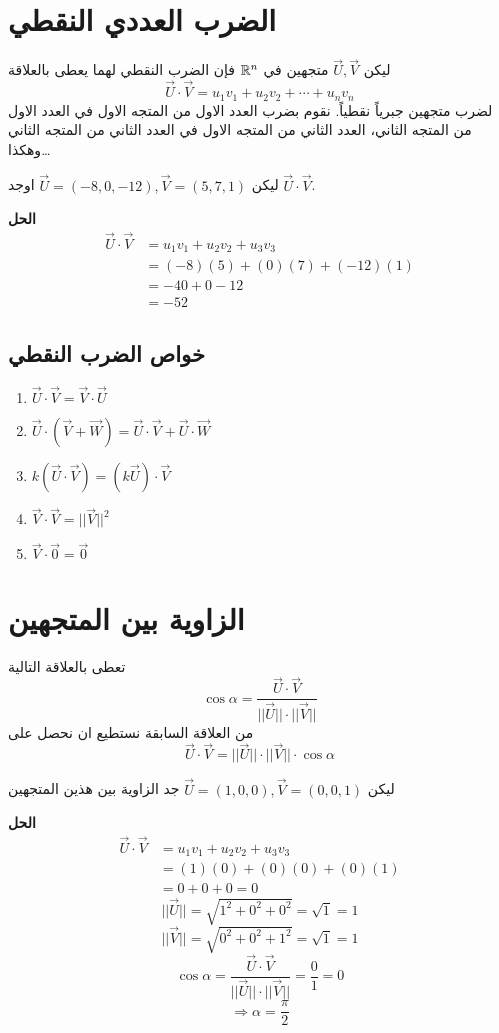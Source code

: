 \section{الضرب العددي النقطي}
ليكن $\vec{U}, \vec{V}$ متجهين في $\mathbb{R}^n$ فإن الضرب النقطي لهما يعطى بالعلاقة 
\[
\vec{U} \cdot \vec{V} = u_1v_1 + u_2v_2 + \cdots + u_nv_n
\]
\noindent
لضرب متجهين جبرياً نقطياً. نقوم بضرب العدد الاول من المتجه الاول في العدد الاول من المتجه الثاني، العدد الثاني من المتجه الاول في العدد الثاني من المتجه الثاني وهكذا\dots
\begin{example}
	ليكن 
	$\vec{U} = (-8, 0, -12), \vec{V}=(5,7,1)$
	اوجد $\vec{U}\cdot\vec{V}$.
\end{example}
\noindent
\textbf{الحل}
\begin{align*}
	\vec{U}\cdot\vec{V} &= u_1v_1 + u_2v_2 + u_3v_3\\
	&= (-8)(5) + (0)(7) + (-12)(1)\\
	&= -40 + 0 -12\\
	&= -52
\end{align*}

\subsection*{خواص الضرب النقطي}

\begin{english}
	\begin{enumerate}
		\item $\vec{U}\cdot\vec{V}=\vec{V}\cdot\vec{U}$
		\item $\vec{U}\cdot(\vec{V}+\vec{W}) = \vec{U}\cdot\vec{V} + \vec{U}\cdot\vec{W}$
		\item $k(\vec{U}\cdot\vec{V}) = (k\vec{U})\cdot\vec{V}$
		\item $\vec{V}\cdot\vec{V} = ||\vec{V}||^2$
		\item $\vec{V}\cdot \vec{0} = \vec{0}$
	\end{enumerate}
\end{english}

\section{الزاوية بين المتجهين}
تعطى بالعلاقة التالية
\[
\cos\alpha = \frac{\vec{U}\cdot\vec{V}}{||\vec{U}|| \cdot ||\vec{V}||}
\]
من العلاقة السابقة نستطيع ان نحصل على
\[
\vec{U}\cdot\vec{V} = ||\vec{U}|| \cdot||\vec{V}||\cdot \cos \alpha
\]

\begin{example}
	ليكن 
	$\vec{U}=(1,0,0), \vec{V}=(0,0,1)$
	جد الزاوية بين هذين المتجهين 
\end{example}
\noindent
\textbf{الحل}
\begin{align*}
	\vec{U}\cdot\vec{V} &= u_1v_1 + u_2 v_2 + u_3 v_3\\
	&= (1)(0) + (0)(0) + (0)(1)\\
	&= 0+0+0=0
\end{align*}
\[
||\vec{U}|| = \sqrt{1^2 + 0^2 + 0^2} = \sqrt{1} =1
\]
\[
||\vec{V}|| = \sqrt{0^2 + 0^2 + 1^2} = \sqrt{1} =1
\]
\[
\cos\alpha = \frac{\vec{U}\cdot\vec{V}}{||\vec{U}|| \cdot ||\vec{V}||} =  \frac{0}{1} = 0
\]
\[
\Rightarrow \alpha =\frac{\pi}{2}
\]

